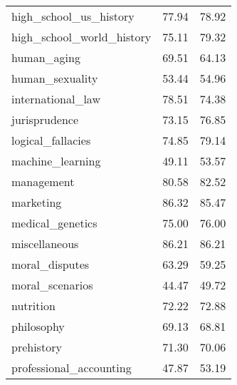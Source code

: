 \begin{table}[t]
\begin{tabular}{L{0.35}C{0.20}C{0.20}}
        high\_school\_us\_history               & 77.94                    & 78.92                      \\
        high\_school\_world\_history            & 75.11                    & 79.32                      \\
        human\_aging                            & 69.51                    & 64.13                      \\
        human\_sexuality                        & 53.44                    & 54.96                      \\
        international\_law                      & 78.51                    & 74.38                      \\
        jurisprudence                           & 73.15                    & 76.85                      \\
        logical\_fallacies                      & 74.85                    & 79.14                      \\
        machine\_learning                       & 49.11                    & 53.57                      \\
        management                              & 80.58                    & 82.52                      \\
        marketing                               & 86.32                    & 85.47                      \\
        medical\_genetics                       & 75.00                    & 76.00                      \\
        miscellaneous                           & 86.21                    & 86.21                      \\
        moral\_disputes                         & 63.29                    & 59.25                      \\
        moral\_scenarios                        & 44.47                    & 49.72                      \\
        nutrition                               & 72.22                    & 72.88                      \\
        philosophy                              & 69.13                    & 68.81                      \\
        prehistory                              & 71.30                    & 70.06                      \\
        professional\_accounting                & 47.87                    & 53.19                      \\

\end{tabular}
\end{table}

